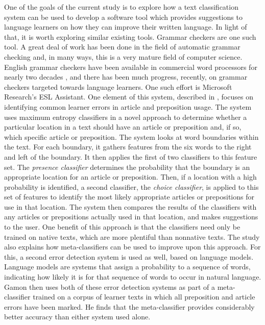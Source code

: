 \documentclass[main.tex]{subfiles}
\begin{document}
One of the goals of the current study is to explore how a text classification system can be used to develop a software tool which provides suggestions to language learners on how they can improve their written language. In light of that, it is worth exploring similar existing tools. Grammar checkers are one such tool. A great deal of work has been done in the field of automatic grammar checking and, in many ways, this is a very mature field of computer science. English grammar checkers have been available in commercial word processors for nearly two decades \citep{vernon:2000}, and there has been much progress, recently, on grammar checkers targeted towards language learners. One such effort is Microsoft Research's ESL Assistant. One element of this system, described in \citet{gamon:2010}, focuses on identifying common learner errors in article and preposition usage. The system uses maximum entropy classifiers in a novel approach to determine whether a particular location in a text should have an article or preposition and, if so, which specific article or preposition. The system looks at word boundaries within the text. For each boundary, it gathers features from the six words to the right and left of the boundary. It then applies the first of two classifiers to this feature set. The \textit{presence classifier} determines the probability that the boundary is an appropriate location for an article or preposition. Then, if a location with a high probability is identified, a second classifier, the \textit{choice classifier}, is applied to this set of features to identify the most likely appropriate articles or prepositions for use in that location. The system then compares the results of the classifiers with any articles or prepositions actually used in that location, and makes suggestions to the user. One benefit of this approach is that the classifiers need only be trained on native texts, which are more plentiful than nonnative texts. The study also explains how meta-classifiers can be used to improve upon this approach. For this, a second error detection system is used as well, based on language models. Language models are systems that assign a probability to a sequence of words, indicating how likely it is for that sequence of words to occur in natural language. Gamon then uses both of these error detection systems as part of a meta-classifier trained on a corpus of learner texts in which all preposition and article errors have been marked. He finds that the meta-classifier provides considerably better accuracy than either system used alone.
\end{document}
